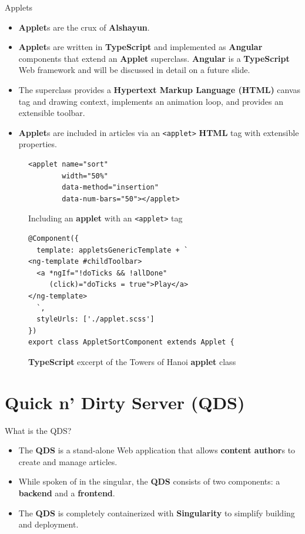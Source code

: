 \documentclass{beamer}
\begin{document}
\begin{frame}{Applets}
    \begin{itemize}
        \item \textbf{Applet}s are the crux of \textbf{Alshayun}.
        \item \textbf{Applet}s are written in \textbf{TypeScript} and
            implemented as \textbf{Angular} components that extend an
            \textbf{Applet} superclass. \textbf{Angular} is a
            \textbf{TypeScript} Web framework and will be discussed in detail on
            a future slide.
        \item The superclass provides a \textbf{Hypertext Markup Language
            (HTML)} canvas tag and drawing context, implements an animation
            loop, and provides an extensible toolbar.
        \item \textbf{Applet}s are included in articles via an \texttt{<applet>}
            \textbf{HTML} tag with extensible properties.
    \end{itemize}
    \begin{figure}
    \begin{verbatim}
<applet name="sort"
        width="50%"
        data-method="insertion"
        data-num-bars="50"></applet>
    \end{verbatim}
        \caption{Including an \textbf{applet} with an \texttt{<applet>} tag}
    \end{figure}
    \begin{figure}
    \begin{verbatim}
@Component({
  template: appletsGenericTemplate + `
<ng-template #childToolbar>
  <a *ngIf="!doTicks && !allDone"
     (click)="doTicks = true">Play</a>
</ng-template>
  `,
  styleUrls: ['./applet.scss']
})
export class AppletSortComponent extends Applet {
    \end{verbatim}
        \caption{\textbf{TypeScript} excerpt of the Towers of Hanoi
        \textbf{applet} class}
    \end{figure}
\end{frame}

\section{Quick n' Dirty Server (QDS)}

\begin{frame}{What is the QDS?}
    \begin{itemize}
        \item The \textbf{QDS} is a stand-alone Web application that allows
            \textbf{content author}s to create and manage articles.
        \item While spoken of in the singular, the \textbf{QDS} consists of two
            components: a \textbf{backend} and a \textbf{frontend}.
        \item The \textbf{QDS} is completely containerized with
            \textbf{Singularity} to simplify building and deployment.
    \end{itemize}
\end{frame}
\end{document}
